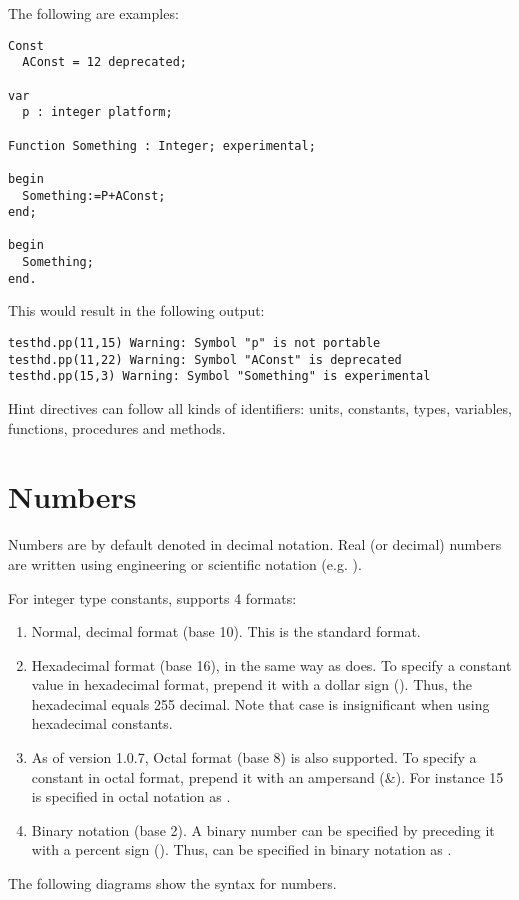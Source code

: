 The following are examples:
\begin{verbatim}
Const
  AConst = 12 deprecated;

var
  p : integer platform;

Function Something : Integer; experimental;

begin
  Something:=P+AConst;
end;

begin
  Something;
end.
\end{verbatim}
This would result in the following output:
\begin{verbatim}
testhd.pp(11,15) Warning: Symbol "p" is not portable
testhd.pp(11,22) Warning: Symbol "AConst" is deprecated
testhd.pp(15,3) Warning: Symbol "Something" is experimental
\end{verbatim}

Hint directives can follow all kinds of identifiers: 
units, constants, types, variables, functions, procedures and methods.

\section{Numbers}
Numbers are by default denoted in decimal notation.
Real (or decimal) numbers are written using engineering or scientific
notation (e.g. ).

For integer type constants, \fpc supports 4 formats:
\begin{enumerate}
\item Normal, decimal format (base 10). This is the standard
format.
\item Hexadecimal format (base 16), in the same way as \tp does.
To specify a constant value in hexadecimal format, prepend it with a dollar
sign (\var{\$}). Thus, the hexadecimal  equals 255 decimal.
Note that case is insignificant when using hexadecimal constants.
\item As of version 1.0.7, Octal format (base 8) is also supported.
To specify a constant in octal format, prepend it with an ampersand (\&).
For instance 15 is specified in octal notation as
.
\item Binary notation (base 2). A binary number can be specified
by preceding it with a percent sign (\var{\%}). Thus,  can be
specified in binary notation as .
\end{enumerate}
The following diagrams show the syntax for numbers.



